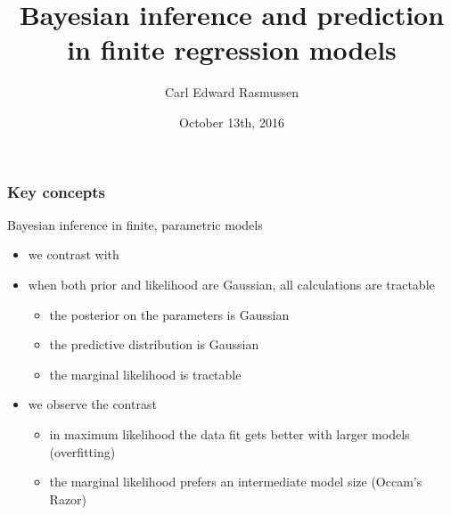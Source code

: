 

\title{Bayesian inference and prediction\\ in finite regression models}
\author{Carl Edward Rasmussen}
\date{October 13th, 2016}



\begin{frame}
\titlepage
\end{frame}

\begin{frame}
\frametitle{Key concepts}

Bayesian inference in finite, parametric models
\begin{itemize}
\item we contrast  with 
\item when both prior and likelihood are Gaussian, all calculations
  are tractable
\begin{itemize}
\item the posterior on the parameters is Gaussian
\item the predictive distribution is Gaussian
\item the marginal likelihood is tractable
\end{itemize}
\item we observe the contrast
\begin{itemize}
\item in maximum likelihood the data fit gets better with larger
  models (overfitting)
\item the marginal likelihood prefers an intermediate model size
  (Occam's Razor)
\end{itemize}
\end{itemize}
\end{frame}


